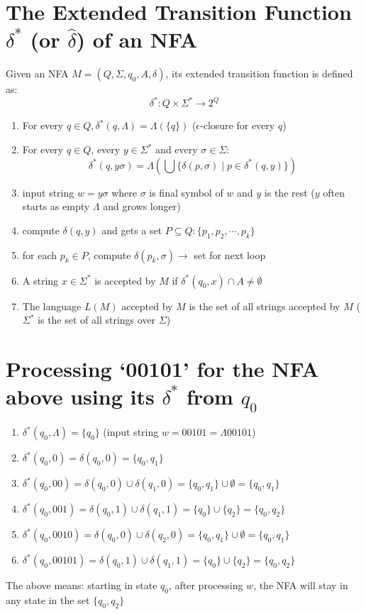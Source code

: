 \documentclass[10pt,a4paper,landscape]{article}
\begin{document}
\begin{multicols*}{3}
\section*{The Extended Transition Function $\delta^{*}$ (or $\hat{\delta}$) of an NFA}
Given an NFA $M = (Q,\Sigma,q_{0},A,\delta)$, its extended transition function is defined as:
\begin{equation*}
  {\delta^{*}}: Q \times \Sigma^{*} \to 2^{Q}
\end{equation*}
\begin{enumerate}
\item For every $q \in Q, \delta^{*}(q,\Lambda) = \Lambda(\{q\})$ ($\epsilon$-closure for every $q$)
\item For every $q \in Q$, every $y \in \Sigma^{*}$ and every $\sigma \in \Sigma$:
  \begin{equation*}
    \delta^{*}(q,y\sigma) = \Lambda\left(\bigcup\{\delta(p,\sigma)\;|\;p \in \delta^{*}(q,y)\}\right)
  \end{equation*}
\item input string $w = y\sigma$ where $\sigma$ is final symbol of $w$ and $y$ is the rest ($y$ often starts as empty $\Lambda$ and grows longer)
\item {} compute $\delta(q,y)$ and gets a set $P\subseteq Q:\{p_{1},p_{2},\cdots,p_{k}\}$
\item {} for each $p_{k} \in P$, compute $\delta(p_{k},\sigma) \to$ set for next loop
\item A string $x \in \Sigma^{*}$ is accepted by $M$ if $\delta^{*}(q_{0},x) \cap A \neq \emptyset$
\item The language $L(M)$ accepted by $M$ is the set of all strings accepted by $M$ ($\Sigma^{*}$ is the set of all strings over $\Sigma$)
\end{enumerate}
\section*{Processing `00101' for the NFA above using its $\delta^{*}$ from $q_{0}$}
\begin{enumerate}
\item $\delta^{*}(q_{0},\Lambda) = \{q_{0}\}$ (input string $w = 00101 = \Lambda 00101$)
\item $\delta^{*}(q_{0},0) = \delta(q_{0},0) = \{q_{0}, q_{1}\}$
\item $\delta^{*}(q_{0},00) = \delta(q_{0},0) \cup \delta(q_{1},0) = \{q_{0}, q_{1}\} \cup \emptyset = \{q_{0}, q_{1}\}$
\item $\delta^{*}(q_{0},001) = \delta(q_{0},1) \cup \delta(q_{1},1) = \{q_{0}\} \cup \{q_{2}\} = \{q_{0}, q_{2}\}$
\item $\delta^{*}(q_{0},0010) = \delta(q_{0},0) \cup \delta(q_{2},0) = \{q_{0}, q_{1}\} \cup \emptyset = \{q_{0}, q_{1}\}$
\item $\delta^{*}(q_{0},00101) = \delta(q_{0},1) \cup \delta(q_{1},1) = \{q_{0}\} \cup \{q_{2}\} = \{q_{0}, q_{2}\}$
\end{enumerate}
The above means: starting in state $q_{0}$, after processing $w$, the NFA will stay in any state in the set $\{q_{0},q_{2}\}$


\end{multicols*}
\end{document}
